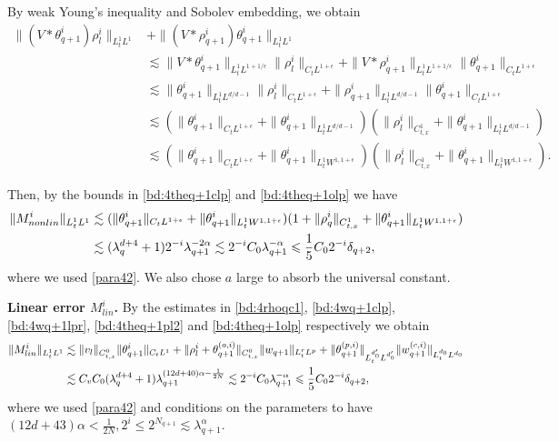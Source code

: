 \documentclass[10pt,a4paper]{amsart}
\numberwithin{equation}{section}
\def\leq{\leqslant}
\def\leq{\leqslant}
\begin{document}
By weak Young's inequality and Sobolev embedding, we obtain 
\begin{align*}
    \|(V*\theta_{q+1}^i)\rho_{l}^i\|_{L^1_tL^1}&+\|(V*\rho_{q+1}^i)\theta_{q+1}^i \|_{L^1_tL^1}\\
    &\lesssim \|V*\theta_{q+1}^i\|_{L_t^1L^{1+1/\epsilon}}\|\rho_{l}^i\|_{C_tL^{1+\epsilon}}+\|V*\rho_{q+1}^i\|_{L_t^1L^{1+1/\epsilon}}\|\theta_{q+1}^i \|_{C_tL^{1+\epsilon}}\\
    &\lesssim \| \theta_{q+1}^i\|_{L^1_tL^{d/d-1}}\|\rho_{l}^i\|_{C_tL^{1+\epsilon}}+\| \rho_{q+1}^i\|_{L^1_tL^{d/d-1}}\|\theta_{q+1}^i \|_{C_tL^{1+\epsilon}}\\
    &\lesssim (\|\theta_{q+1}^i \|_{C_tL^{1+\epsilon}}+\| \theta_{q+1}^i\|_{L^1_tL^{d/d-1}})(\|\rho_{l}^i\|_{C_{t,x}^1}+\| \theta_{q+1}^i\|_{L^1_tL^{d/d-1}} )\\
    &\lesssim (\|\theta_{q+1}^i \|_{C_tL^{1+\epsilon}}+\| \theta_{q+1}^i\|_{L^1_tW^{1,1+\epsilon}})(\|\rho_{l}^i\|_{C_{t,x}^1}+\|  \theta_{q+1}^i\|_{L^1_tW^{1,1+\epsilon}} ).
\end{align*}
 
Then, by     the bounds in  \eqref{bd:4theq+1clp}  and \eqref{bd:4theq+1olp}    we have
\begin{align}
    \|M^{i}_{nonlin}\|_{L^1_tL^1} 
      &\lesssim ( \|\theta^{i}_{q+1}\|_{C_tL^{1+\epsilon}}+ \|\theta^{i}_{q+1}\|_{L^1_tW^{1,1+\epsilon}})  (1+\|\rho^{i}_{q}\|_{C_{t,x}^1}+\| \theta_{q+1}^i\|_{L^1_tW^{1,1+\epsilon}} )  \notag\\
      &\lesssim( \lambda_{q}^{d+4}+1)2^{-i}\lambda_{q+1}^{-2\alpha}\lesssim  2^{-i} C_0 \lambda_{q+1}^{-\alpha}\leq \frac{1}{5}C_02^{-i}\delta_{q+2},\label{arhorho-arhorho}
\end{align}
where we used  \eqref{para42}. We also chose $a$ large to absorb the universal constant. 


\textbf{Linear error $M^{i}_{lin}$.} 
By the estimates  
in \eqref{bd:4rhoqc1}, \eqref{bd:4wq+1clp}, \eqref{bd:4wq+1lpr}, \eqref{bd:4theq+1pl2} and  \eqref{bd:4theq+1olp} respectively we obtain
\begin{align}
 \|M^{i}_{lin}\|_{L^1_tL^1}&\lesssim \|v_l\|_{C_{t,x}^0}\|\theta_{q+1}^{i}\|_{C_tL^1}+\|\rho^{i}_l+\theta_{q+1}^{(o,i)}\|_{C_{t,x}^0}
\|w_{q+1}\|_{L^r_tL^p}+   \| \theta_{q+1}^{(p,i)}\|_{L^{d_0'}_tL^{d_0'}}\|w_{q+1}^{(c,i)}\|_{L^{d_0}_tL^{d_0}}\notag\\
&\lesssim C_vC_0(\lambda_{q}^{d+4}+1)\lambda_{q+1}^{(12d+40)\alpha-\frac1{2N}}
\lesssim 2^{-i} C_0 \lambda_{q+1}^{-\alpha}\leq  \frac{1}{5}C_02^{-i}\delta_{q+2},\notag
\end{align}
where we used  \eqref{para42} and   conditions on the parameters to have $(12d+43)\alpha<\frac{1}{2N},2^i\leq2^{N_{q+1}}\lesssim \lambda_{q+1}^\alpha$. 
\end{document}
